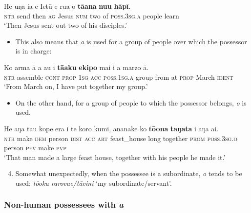 \ea\label{ex:6.66}
\gll He uŋa ia e Ietū e rua o \textbf{tā{\ꞌ}ana} \textbf{nu{\ꞌ}u} \textbf{hāpī}. \\
\textsc{ntr} send then \textsc{ag} Jesus \textsc{num} two of \textsc{poss.3sg.a} people learn \\

\glt
‘Then Jesus sent out two of his disciples.’ \textstyleExampleref{[Mrk. 14:13]}
\z

\begin{itemize}
\item[]
This also means that \textit{{\ꞌ}a} is used for a group of people over which the possessor is in charge: 
\end{itemize}

\ea\label{ex:6.67}
\gll Ko arma {\ꞌ}ā a au i \textbf{tā{\ꞌ}aku} \textbf{ekipo} mai i a marzo {\ꞌ}ā. \\
\textsc{ntr} assemble \textsc{cont} \textsc{prop} \textsc{1sg} \textsc{acc} \textsc{poss.1sg.a} group from at \textsc{prop} March \textsc{ident} \\

\glt
‘From March on, I have put together my group.’ \textstyleExampleref{[R625.082]} 
\z

\begin{itemize}
\item[]
On the other hand, for a group of people to which the possessor belongs, \textit{o} is used. 
\end{itemize}

\ea\label{ex:6.68}
\gll He aŋa tau kope era i te koro kumi, ananake ko \textbf{tō{\ꞌ}ona} \textbf{taŋata} i aŋa ai.\\
\textsc{ntr} make \textsc{dem} person \textsc{dist} \textsc{acc} \textsc{art} feast\_house long together \textsc{prom} \textsc{poss.3sg.o}  person \textsc{pfv} make \textsc{pvp}\\

\glt
‘That man made a large feast house, together with his people he made it.’ \textstyleExampleref{[Mtx-4-03.003]}
\z

\begin{enumerate}
\setcounter{enumi}{3}
\item 
Somewhat unexpectedly, when the possessee is a subordinate, \textit{o} tends to be used: \textit{tō{\ꞌ}oku rarova{\ꞌ}e/tāvini} ‘my subordinate/servant’.

\end{enumerate}
\subsubsection[Non{}-human possessees with {\ꞌ}a]{Non-human possessees with \textit{{\ꞌ}a}}\label{sec:6.3.3.2}

